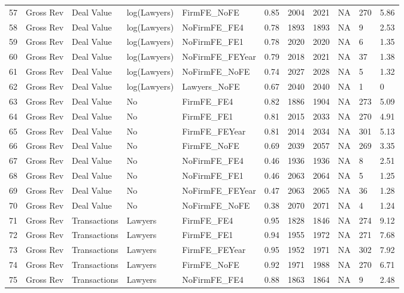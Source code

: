 \begin{table}[ht]
\begin{tabular}{rllllllllll}
  57 & Gross Rev & Deal Value & log(Lawyers) & FirmFE\_NoFE & 0.85 & 2004 & 2021 & NA & 270 & 5.86 \\ 
  58 & Gross Rev & Deal Value & log(Lawyers) & NoFirmFE\_FE4 & 0.78 & 1893 & 1893 & NA & 9 & 2.53 \\ 
  59 & Gross Rev & Deal Value & log(Lawyers) & NoFirmFE\_FE1 & 0.78 & 2020 & 2020 & NA & 6 & 1.35 \\ 
  60 & Gross Rev & Deal Value & log(Lawyers) & NoFirmFE\_FEYear & 0.79 & 2018 & 2021 & NA & 37 & 1.38 \\ 
  61 & Gross Rev & Deal Value & log(Lawyers) & NoFirmFE\_NoFE & 0.74 & 2027 & 2028 & NA & 5 & 1.32 \\ 
  62 & Gross Rev & Deal Value & log(Lawyers) & Lawyers\_NoFE & 0.67 & 2040 & 2040 & NA & 1 & 0 \\ 
  63 & Gross Rev & Deal Value & No & FirmFE\_FE4 & 0.82 & 1886 & 1904 & NA & 273 & 5.09 \\ 
  64 & Gross Rev & Deal Value & No & FirmFE\_FE1 & 0.81 & 2015 & 2033 & NA & 270 & 4.91 \\ 
  65 & Gross Rev & Deal Value & No & FirmFE\_FEYear & 0.81 & 2014 & 2034 & NA & 301 & 5.13 \\ 
  66 & Gross Rev & Deal Value & No & FirmFE\_NoFE & 0.69 & 2039 & 2057 & NA & 269 & 3.35 \\ 
  67 & Gross Rev & Deal Value & No & NoFirmFE\_FE4 & 0.46 & 1936 & 1936 & NA & 8 & 2.51 \\ 
  68 & Gross Rev & Deal Value & No & NoFirmFE\_FE1 & 0.46 & 2063 & 2064 & NA & 5 & 1.25 \\ 
  69 & Gross Rev & Deal Value & No & NoFirmFE\_FEYear & 0.47 & 2063 & 2065 & NA & 36 & 1.28 \\ 
  70 & Gross Rev & Deal Value & No & NoFirmFE\_NoFE & 0.38 & 2070 & 2071 & NA & 4 & 1.24 \\ 
  71 & Gross Rev & Transactions & Lawyers & FirmFE\_FE4 & 0.95 & 1828 & 1846 & NA & 274 & 9.12 \\ 
  72 & Gross Rev & Transactions & Lawyers & FirmFE\_FE1 & 0.94 & 1955 & 1972 & NA & 271 & 7.68 \\ 
  73 & Gross Rev & Transactions & Lawyers & FirmFE\_FEYear & 0.95 & 1952 & 1971 & NA & 302 & 7.92 \\ 
  74 & Gross Rev & Transactions & Lawyers & FirmFE\_NoFE & 0.92 & 1971 & 1988 & NA & 270 & 6.71 \\ 
  75 & Gross Rev & Transactions & Lawyers & NoFirmFE\_FE4 & 0.88 & 1863 & 1864 & NA & 9 & 2.48 \\ 

\end{tabular}
\end{table}
